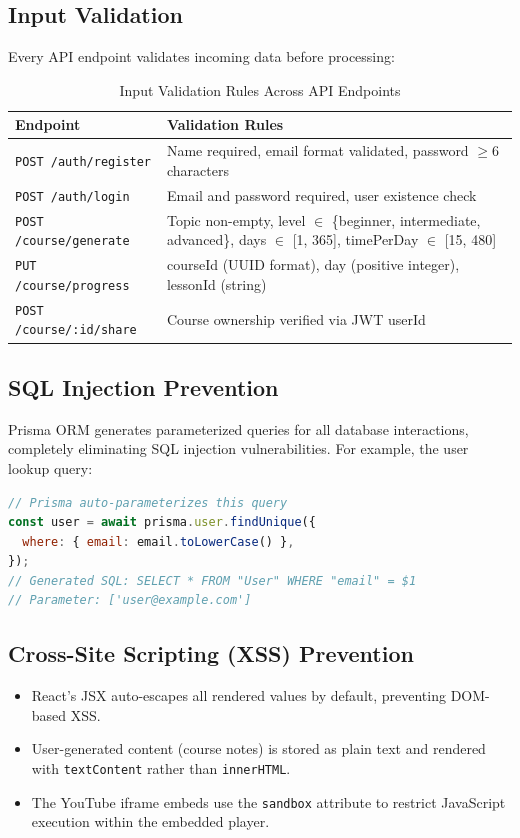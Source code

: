 \documentclass[12pt,a4paper]{report}
\begin{document}
\subsection{Input Validation}
Every API endpoint validates incoming data before processing:

\begin{table}[H]
\centering
\caption{Input Validation Rules Across API Endpoints}
\label{tab:input-validation}
\begin{tabularx}{\textwidth}{l X}
\toprule
\textbf{Endpoint} & \textbf{Validation Rules} \\
\midrule
\texttt{POST /auth/register} & Name required, email format validated, password $\geq$6 characters \\
\texttt{POST /auth/login} & Email and password required, user existence check \\
\texttt{POST /course/generate} & Topic non-empty, level $\in$ \{beginner, intermediate, advanced\}, days $\in$ [1, 365], timePerDay $\in$ [15, 480] \\
\texttt{PUT /course/progress} & courseId (UUID format), day (positive integer), lessonId (string) \\
\texttt{POST /course/:id/share} & Course ownership verified via JWT userId \\
\bottomrule
\end{tabularx}
\end{table}

\subsection{SQL Injection Prevention}
Prisma ORM generates parameterized queries for all database interactions, completely eliminating SQL injection vulnerabilities. For example, the user lookup query:

\begin{lstlisting}[language=JavaScript,caption={Prisma Parameterized Query Example}]
// Prisma auto-parameterizes this query
const user = await prisma.user.findUnique({
  where: { email: email.toLowerCase() },
});
// Generated SQL: SELECT * FROM "User" WHERE "email" = $1
// Parameter: ['user@example.com']
\end{lstlisting}

\subsection{Cross-Site Scripting (XSS) Prevention}
\begin{itemize}[noitemsep]
    \item React's JSX auto-escapes all rendered values by default, preventing DOM-based XSS.
    \item User-generated content (course notes) is stored as plain text and rendered with \texttt{textContent} rather than \texttt{innerHTML}.
    \item The YouTube iframe embeds use the \texttt{sandbox} attribute to restrict JavaScript execution within the embedded player.
\end{itemize}
\end{document}
